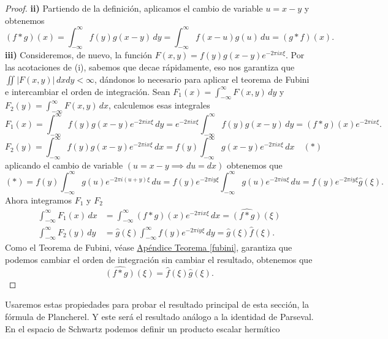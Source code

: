 \documentclass[12pt]{article}
\theoremstyle{plain}
\theoremstyle{definition}
\numberwithin{equation}{section}
\begin{document}
\begin{proof}
                \textbf{ii)} Partiendo de la definición, aplicamos el cambio de variable \(u = x-y\) y obtenemos
                \begin{equation*}
                    (f * g)(x) = \int_{-\infty}^{\infty} f(y)g(x-y) \,dy = \int_{-\infty}^{\infty} f(x-u)g(u) \,du = (g * f)(x).
                \end{equation*}
                \textbf{iii)} Consideremos, de nuevo, la función \(F(x,y) = f(y)g(x-y)e^{-2\pi ix\xi}\). Por las acotaciones de (i), sabemos que decae rápidamente, eso nos garantiza que \(\iint \left\lvert F(x,y) \right\rvert \,dxdy < \infty\), dándonos lo necesario para aplicar el teorema de Fubini e intercambiar el orden de integración. Sean \(F_1(x) = \int_{-\infty}^{\infty} F(x,y) \,dy\) y \(F_2(y) = \int_{-\infty}^{\infty} F(x,y) \,dx\), calculemos esas integrales $$F_1(x) = \int_{-\infty}^{\infty} f(y)g(x-y)e^{-2\pi ix\xi} \,dy = e^{-2\pi ix\xi} \int_{-\infty}^{\infty} f(y)g(x-y) \,dy = (f * g)(x)e^{-2\pi ix\xi}.$$ $$ F_2(y) = \int_{-\infty}^{\infty} f(y)g(x-y)e^{-2\pi ix\xi} \,dx = f(y) \int_{-\infty}^{\infty} g(x-y)e^{-2\pi ix\xi} \,dx \quad (\ast)$$
                aplicando el cambio de variable \(\left( u = x-y \implies du = dx \right)\) obtenemos que $$ (\ast) = f(y) \int_{-\infty}^{\infty} g(u)e^{-2\pi i(u+y)\xi} \,du = f(y)e^{-2\pi iy\xi} \int_{-\infty}^{\infty} g(u)e^{-2\pi iu\xi} \,du
                    = f(y)e^{-2\pi iy\xi} \hat{g}(\xi) .$$
                Ahora integramos \(F_1\) y \(F_2\)
                \begin{align*}
                    \int_{-\infty}^{\infty} F_1(x) \,dx &= \int_{-\infty}^{\infty} (f * g)(x)e^{-2\pi ix\xi} \,dx = \widehat{(f * g)}(\xi) \\
                    \int_{-\infty}^{\infty} F_2(y) \,dy &= \hat{g}(\xi) \int_{-\infty}^{\infty} f(y)e^{-2\pi iy\xi} \,dy = \hat{g}(\xi)\hat{f}(\xi).
                \end{align*}
                Como el Teorema de Fubini, véase \hyperref[fubini]{Apéndice Teorema \ref*{fubini}}, garantiza que podemos cambiar el orden de integración sin cambiar el resultado, obtenemos que
                \begin{equation*}
                    \widehat{(f * g)}(\xi) = \hat{f}(\xi)\hat{g}(\xi).
                \end{equation*}
            \end{proof}
            Usaremos estas propiedades para probar el resultado principal de esta sección, la fórmula de Plancherel. Y este será el resultado análogo a la identidad de Parseval. En el espacio de Schwartz podemos definir un producto escalar hermítico
\end{document}
